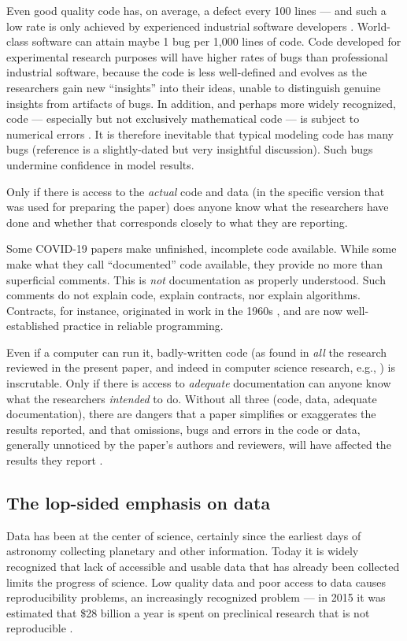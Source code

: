 \documentclass{comjnl}
\begin{document}
Even good quality code has, on average, a defect every 100 lines --- and {such a low} rate is only achieved by experienced industrial software developers \cite{ourReview}. World-class software can attain maybe 1 bug per 1,000 lines of code. Code developed for experimental research purposes will have higher rates of bugs than professional industrial software, because the code is less well-defined and evolves as the researchers gain new ``insights'' into their ideas, unable to distinguish genuine insights from artifacts of bugs. In addition, and perhaps more widely recognized, code --- especially but not exclusively mathematical code --- is subject to numerical errors \cite{hamming}. It is therefore inevitable that typical modeling code has many bugs (reference \cite{NVP} is a slightly-dated but very insightful discussion). Such bugs undermine confidence in model results. 

Only if there is access to the \emph{actual\/} code and data (in the specific version that was used for preparing the paper) does anyone know what the researchers have done and whether that corresponds closely to what they are reporting.

Some COVID-19 papers  make unfinished, incomplete code available. While some  make what they call ``documented'' code available, they provide no more than superficial comments. This is \emph{not\/} documentation as properly understood. Such comments do not explain code, explain contracts, nor explain algorithms. Contracts, for instance, originated in work in the 1960s \cite{hoare}, and are now well-established practice in reliable programming.

Even if a computer can run it, badly-written code (as found in \emph{all\/} the research reviewed in the present paper, and indeed in computer science research, e.g., \cite{machine-learning-reproducibility}) is inscrutable. Only if there is access to \emph{adequate\/} documentation can anyone know what the researchers \emph{intended\/} to do. Without all three (code, data, adequate documentation), there are dangers that a paper simplifies or exaggerates the results reported, and that omissions, bugs and errors in the code or data, generally unnoticed by the paper's authors and reviewers, will have affected the results they report \cite{relit}. 

\label{section-discussion}
\subsection{The lop-sided emphasis on data}
\label{critique-fair}
Data has been at the center of science, certainly since the earliest days of astronomy collecting planetary and other information. Today it is widely recognized that lack of accessible and usable data that has already been collected limits the progress of science. Low quality data and poor access to data causes reproducibility problems, an increasingly recognized problem --- in 2015 it was estimated that \$28 billion a year is spent on preclinical research that is not reproducible \cite{preclinical-reproducibility}.
\end{document}
